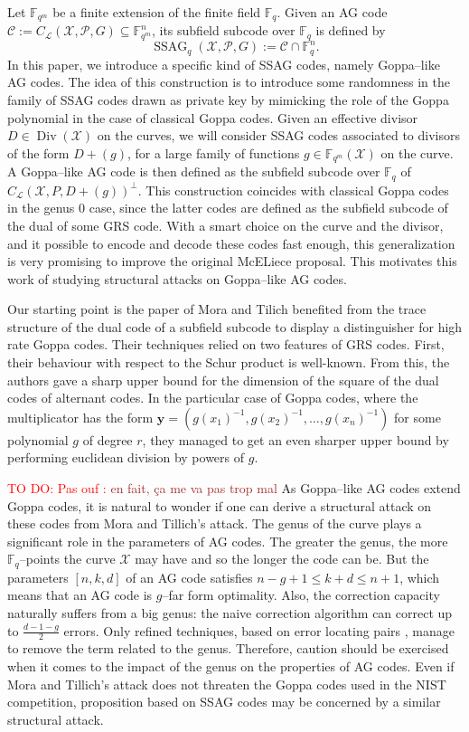 \documentclass[a4paper]{article}
\theoremstyle{definition}
\theoremstyle{remark}
\newcommand{\calP}{\mathcal{P}}
\newcommand{\calL}{\mathcal{L}}
\newcommand{\calC}{\mathcal{C}}
\newcommand{\calX}{\mathcal{X}}
\newcommand{\fqm}{\mathbb{F}_{q^m}}
\newcommand{\fq}{\mathbb{F}_{q}}
\newcommand{\F}{\mathbb{F}}
\newcommand{\Div}{\operatorname{Div}}
\newcommand{\ssag}[1]{\operatorname{SSAG}_{q}\left(#1\right)}
\newcommand\TODO[1]{\textcolor{red}{TO DO: #1}}
\newcommand\mathieu[1]{\textcolor{brown}{#1}}
\begin{document}
Let $\fqm$ be a finite extension of the finite field $\fq$. Given an AG code $\calC :=C_{\calL}(\calX,\calP,G) \subseteq \fqm^n$, its subfield subcode over $\fq$ is defined by 
$$\ssag{\calX,\calP,G} := \calC \cap \fq^n.$$  
In this paper, we introduce a specific kind of SSAG codes, namely Goppa--like AG codes. The idea of this construction is to introduce  some randomness in the family of SSAG codes drawn as private key by mimicking the role of the Goppa polynomial in the case of classical Goppa codes. Given an effective divisor $D\in \Div(\calX)$ on the curves, we will consider SSAG codes associated to  divisors of the form $D+(g)$, for a large family of functions $g \in \fqm(\calX)$ on the curve. A Goppa--like AG code is then defined as the subfield subcode over $\fq$ of $C_{\calL}(\calX,P,D+(g))^{\perp}$. This construction coincides with classical Goppa codes in the genus 0 case, since the latter codes are defined as the subfield subcode of the dual of some GRS code. With a smart choice on the curve and the divisor, and it possible to encode and decode these codes fast enough, this generalization is very promising to improve the original McELiece proposal. This motivates this work of studying structural attacks on Goppa--like AG codes. 

Our starting point is the paper of Mora and Tilich \cite{MT21} benefited from the trace structure of the dual code of a subfield subcode to display a distinguisher for high rate Goppa codes. Their techniques relied on two features of GRS codes. First, their behaviour with respect to the Schur product is well-known. From this, the authors gave a sharp upper bound for the dimension of the square of the dual codes of alternant codes. In the particular case of Goppa codes, where the multiplicator has the form $\mathbf{y}=(g(x_1)^{-1},g(x_2)^{-1},\dots,g(x_n)^{-1})$ for some polynomial $g$ of degree $r$, they managed to get an even sharper upper bound by performing euclidean division by powers of $g$.

\TODO{Pas ouf :} \mathieu{en fait, ça me va pas trop mal} As Goppa--like AG codes extend Goppa codes, it is natural to wonder if one can derive a structural attack on these codes from Mora and Tillich's attack. The genus of the curve plays a significant role in the parameters of AG codes. The greater the genus, the more $\F_q$--points the curve $\calX$ may have and so the longer the code can be. But the parameters $[n,k,d]$ of an AG code satisfies $n-g+1 \leq k+d \leq n+1$, which means that an AG code is $g$--far form optimality. Also, the correction capacity naturally suffers from a big genus: the naive correction algorithm can correct up to $\frac{d-1-g}{2}$ errors. Only refined techniques, based on error locating pairs \cite{CP20}, manage to remove the term related to the genus. Therefore, caution should be exercised when it comes to the impact of the genus on the properties of AG codes.
Even if Mora and Tillich's attack does not threaten the Goppa codes used in the NIST competition, proposition based on SSAG codes may be concerned by a similar structural attack. 
\end{document}
